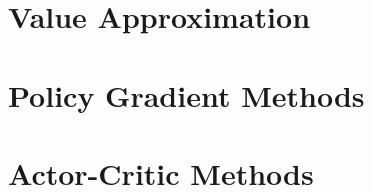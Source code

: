 \documentclass{article}
\begin{document}
\section{Value Approximation}

\section{Policy Gradient Methods}

\section{Actor-Critic Methods}

\end{document}
